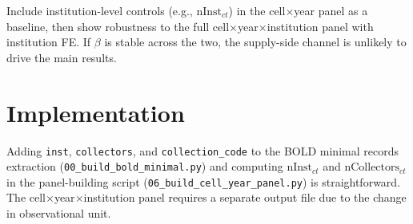 \documentclass[10pt]{article}
\begin{document}
Include institution-level controls (e.g., $\text{nInst}_{ct}$) in the cell$\times$year panel as a baseline, then show robustness to the full cell$\times$year$\times$institution panel with institution FE. If $\beta$ is stable across the two, the supply-side channel is unlikely to drive the main results.

\section*{Implementation}

Adding \texttt{inst}, \texttt{collectors}, and \texttt{collection\_code} to the BOLD minimal records extraction (\texttt{00\_build\_bold\_minimal.py}) and computing $\text{nInst}_{ct}$ and $\text{nCollectors}_{ct}$ in the panel-building script (\texttt{06\_build\_cell\_year\_panel.py}) is straightforward. The cell$\times$year$\times$institution panel requires a separate output file due to the change in observational unit.
\end{document}

